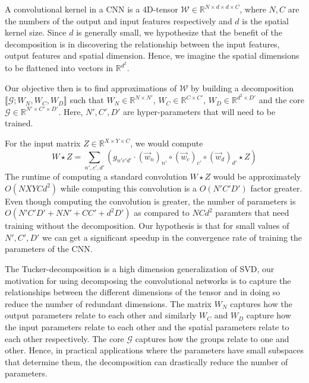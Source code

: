 \documentclass[a4paper]{article}
\newcommand{\R}{\mathbb{R}}
\newcommand{\Wc}{\mathcal{W}}
\begin{document}
A convolutional kernel in a CNN is a 4D-tensor $\Wc \in \R^{N \times d \times d \times C}$, where $N, C$ are the numbers of the output and input features respectively and $d$ is the spatial kernel size. Since $d$ is generally small, we hypothesize that the benefit of the decomposition is in discovering the relationship between the input features, output features and spatial dimension. Hence, we imagine the spatial dimensions to be flattened into vectors in $\R^{d^2}$. 

Our objective then is to find approximations of $\Wc$ by building a decomposition $\llbracket \mathcal{G}; W_N, W_C, W_D\rrbracket$ such that $W_N \in \R^{N \times N'}$, $W_C \in \R^{C \times C'}$, $W_D \in \R^{d^2 \times D'}$ and  the core $\mathcal{G} \in \R^{N' \times C' \times D'}$. Here, $N', C', D'$ are hyper-parameters that will need to be trained.

For the input matrix $Z \in \R^{X \times Y \times C}$, we would compute 
$$W \star Z = \sum_{n', c', d'} \left( g_{n'c'd'} \cdot (\vec{w}_n)_{n'} \circ (\vec{w}_c)_{c'} \circ (\vec{w}_d)_{d'} \star Z \right)$$ 
The runtime of computing a standard convolution $W \star Z$ would be approximately $O(NXYCd^2)$ while computing this convolution is a $O(N'C'D')$ factor greater. Even though computing the convolution is greater, the number of parameters is $O(N'C'D' + NN' + CC' + d^2D')$ as compared to $NCd^2$ paramters that need training without the decomposition. Our hypothesis is that for small values of $N',C',D'$ we can get a significant speedup in the convergence rate of training the parameters of the CNN. 

The Tucker-decomposition is a high dimension generalization of \textsf{SVD}, our motivation for using decomposing the convolutional networks is to capture the relationships between the different dimensions of the tensor and in doing so reduce the number of redundant dimensions. The matrix $W_N$ captures how the output parameters relate to each other and similarly $W_C$ and $W_D$ capture how the input parameters relate to each other and the spatial parameters relate to each other respectively. The core $\mathcal{G}$ captures how the groups relate to one and other. Hence, in practical applications where the parameters have small subspaces that determine them, the decomposition can drastically reduce the number of parameters.
\end{document}
